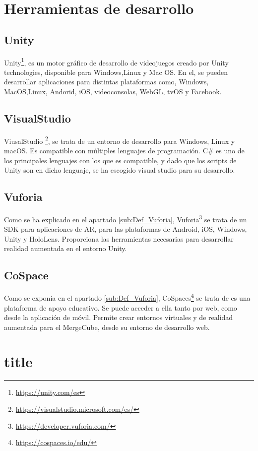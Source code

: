 \section{Herramientas de desarrollo}
\subsection{Unity}
Unity\footnote{\url{https://unity.com/es}}, es un motor gráfico de desarrollo de videojuegos creado por Unity technologies, disponible para Windows,Linux y Mac OS. En el, se pueden desarrollar aplicaciones para distintas plataformas como, Windows, MacOS,Linux, Andorid, iOS, videoconsolas, WebGL, tvOS y Facebook.
\subsection{VisualStudio}
ViusalStudio \footnote{\url{https://visualstudio.microsoft.com/es/}}, se trata de un entorno de desarrollo para Windows, Linux y macOS. Es compatible con múltiples lenguajes de programación. C\# es uno de los principales lenguajes con los que es compatible, y dado que los scripts de Unity son en dicho lenguaje, se ha escogido visual studio para su desarrollo.

\subsection{Vuforia}
Como se ha explicado en el apartado \ref{sub:Def_Vuforia}, Vuforia\footnote{\url{https://developer.vuforia.com/}} se trata de un SDK para aplicaciones de AR, para las plataformas de Android, iOS, Windows, Unity y HoloLens. Proporciona las herramientas necesarias para desarrollar realidad aumentada en el entorno Unity.
\subsection{CoSpace}
Como se exponía en el apartado \ref{sub:Def_Vuforia}, CoSpaces\footnote{\url{https://cospaces.io/edu/}} se trata de  es una plataforma de apoyo educativo. Se puede acceder a ella tanto por web, como desde la aplicación de móvil. Permite crear entornos virtuales y de realidad aumentada para el MergeCube, desde su entorno de desarrollo web.

\section{title}
